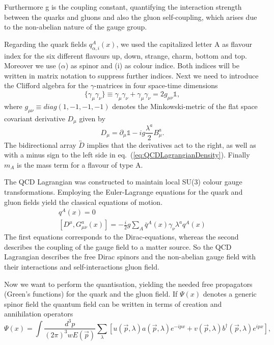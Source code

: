 Furthermore g is the coupling constant, quantifying the interaction strength between the quarks and gluons and also the gluon self-coupling, which arises due to the non-abelian nature of the gauge group.
\par
Regarding the quark fields $q^A_{\alpha,i}(x)$, we used the capitalized letter A as flavour index for the six different flavours up, down, strange, charm, bottom and top. Moreover we use ($\alpha$) as spinor and (i) as colour indice. Both indices will be written in matrix notation to suppress further indices. Next we need to introduce the Clifford algebra for the $\gamma$-matrices in four space-time dimensions
\begin{equation}
	\{\gamma_\mu \gamma_\nu \} \equiv \gamma_\mu \gamma_\nu + \gamma_\mu \gamma_\nu = 2 g_{\mu\nu}\mathbb{1},
\end{equation}
where $g_{\mu\nu} \equiv diag(1,-1,-1,-1)$ denotes the Minkowski-metric of the flat space covariant derivative $D_\mu$ given by
\begin{equation}
	D_\mu = \partial_\mu \mathbb{1} - ig \frac{\lambda^a}{2} B^a_\mu.
\end{equation}
The bidirectional array $\overleftrightarrow{D}$ implies that the derivatives act to the right, as well as with a minus sign to the left side in eq.~(\ref{eq:QCDLagrangianDensity}). Finally $m_A$ is the mass term for a flavour of type A.
\par
The QCD Lagrangian was constructed to maintain local SU(3) colour gauge transformations. Employing the Euler-Lagrange equations for the quark and gluon fields yield the classical equations of motion.
\begin{align}
	[i\gamma^\mu D_\mu - m_A]q^A(x) = 0 \\
	[D^\mu, G^a_{\mu\nu}(x)] = -\frac{i}{2}g \sum_A \bar q^A (x) \gamma_\nu \lambda^a q^A (x)
\end{align} 
The first equations corresponds to the Dirac-equations, whereas the second describes the coupling of the gauge field to a matter source. So the QCD Lagrangian describes the free Dirac spinors and the non-abelian gauge field with their interactions and self-interactions gluon field.	
\par
Now we want to perform the quantisation, yielding the needed free propagators (Green's functions) for the quark and the gluon field. If $\Psi(x)$ denotes a generic spinor field the quantum field can be written in terms of creation and annihilation operators
\begin{equation}
	\Psi(x) = \int \frac{d^3p}{(2\pi)^3wE(\vec p)} \sum_\lambda [u(\vec p, \lambda) a(\vec p, \lambda) e^{-ipx} + v(\vec p, \lambda) b^\dagger (\vec p, \lambda) e^{ipx}],
\end{equation}
